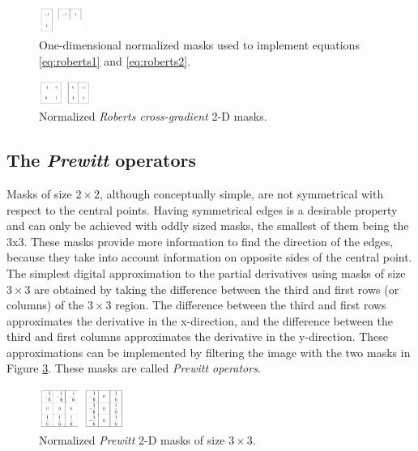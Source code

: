\documentclass{ipol}
\numberwithin{equation}{section}
\numberwithin{table}{section}
\numberwithin{figure}{section}
\begin{document}
\begin{figure}
	\centering
	\includegraphics[width=0.13\textwidth]{1dmasks_n.pdf}
	\caption{One-dimensional normalized masks used to implement equations \ref{eq:roberts1} and \ref{eq:roberts2}.}
	\label{fig:1dmasks}
\end{figure}

\begin{figure}
	\centering
	\includegraphics[width=0.15\textwidth]{roberts_n.pdf}
	\caption{Normalized \textit{Roberts cross-gradient} 2-D masks.}
	\label{fig:roberts}
\end{figure}


\subsection{The \textit{Prewitt} operators}

Masks of size $2\times2$, although conceptually simple, are not symmetrical with respect to the central points. 
Having symmetrical edges is a desirable property and can only be achieved with oddly sized masks, the smallest 
of them being the 3x3. These masks provide more information to find the direction of the edges, because they take 
into account information on opposite sides of the central point. \\

The simplest digital approximation to the partial derivatives using masks of size $3\times3$ are obtained 
by taking the difference between the third and first rows (or columns) of the $3\times3$ region. The
difference between the third and first rows approximates the derivative in the x-direction, and 
the difference between the third and first columns approximates the derivative in the y-direction.
These approximations can be implemented by filtering the image with the two masks in Figure \ref{fig:prewitt}.
These masks are called \textit{Prewitt operators}. \\

\begin{figure}
	\centering
	\includegraphics[width=0.25\textwidth]{prewitt_n.pdf}
	\caption{Normalized \textit{Prewitt} 2-D masks of size $3\times3$.}
	\label{fig:prewitt}
\end{figure}
\end{document}
